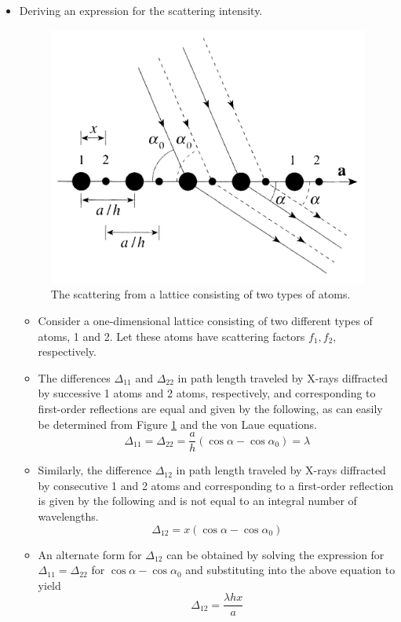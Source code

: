 \documentclass[../notes.tex]{subfiles}
\begin{document}
\begin{itemize}
    \item Deriving an expression for the scattering intensity.
    \begin{figure}[h!]
        \centering
        \includegraphics[width=0.37\linewidth]{../ExtFiles/2atomScattering.png}
        \caption{The scattering from a lattice consisting of two types of atoms.}
        \label{fig:2atomScattering}
    \end{figure}
    \begin{itemize}
        \item Consider a one-dimensional lattice consisting of two different types of atoms, 1 and 2. Let these atoms have scattering factors $f_1,f_2$, respectively.
        \item The differences $\Delta_{11}$ and $\Delta_{22}$ in path length traveled by X-rays diffracted by successive 1 atoms and 2 atoms, respectively, and corresponding to first-order reflections are equal and given by the following, as can easily be determined from Figure \ref{fig:2atomScattering} and the von Laue equations.
        \begin{equation*}
            \Delta_{11} = \Delta_{22}
            = \frac{a}{h}(\cos\alpha-\cos\alpha_0)
            = \lambda
        \end{equation*}
        \item Similarly, the difference $\Delta_{12}$ in path length traveled by X-rays diffracted by consecutive 1 and 2 atoms and corresponding to a first-order reflection is given by the following and is not equal to an integral number of wavelengths.
        \begin{equation*}
            \Delta_{12} = x(\cos\alpha-\cos\alpha_0)
        \end{equation*}
        \item An alternate form for $\Delta_{12}$ can be obtained by solving the expression for $\Delta_{11}=\Delta_{22}$ for $\cos\alpha-\cos\alpha_0$ and substituting into the above equation to yield
        \begin{equation*}
            \Delta_{12} = \frac{\lambda hx}{a}
        \end{equation*}

\end{itemize}
\end{itemize}
\end{document}
